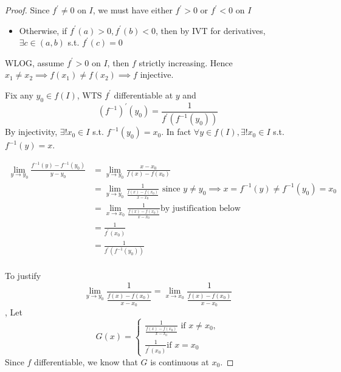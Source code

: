 \begin{proof}
    Since $f^{\prime} \neq 0$ on $I$, we must have
    either $f^{\prime} > 0$ or $f^{\prime} < 0$
    on $I$
    \begin{itemize}
        \item Otherwise, if $f^{\prime}(a) > 0, f^{\prime}(b) < 0$,
        then by IVT for derivatives, $\exists c \in (a, b)$ s.t. 
        $f^{\prime}(c) = 0$
    \end{itemize} 
    WLOG, assume $f^{\prime} > 0$ on $I$, then $f$ strictly increasing.
    Hence $x_1 \neq x_2 \implies f(x_1) \neq f(x_2) \implies f$  injective.
    \medskip

    Fix any $y_{0} \in f(I)$, WTS $f^{\prime}$ differentiable at $y$ and
    \[
        (f^{-1})^{\prime}(y_{0}) = 
        \frac{1}{ f^{\prime} \left( f^{-1}(y_{0}) \right) }
    \]
    By injectivity, $\exists !x_0 \in I $ s.t. 
    $f^{-1}(y_0) = x_0$.
    In fact $ \forall y \in f(I), \exists ! x_0 \in I$
    s.t. $f^{-1}(y) = x$.

    \begin{align*}
        \lim_{y \to y_{0}} \frac{f^{-1}(y) - f^{-1}(y_{0})}{y - y_{0}}
        &=
        \lim_{y \to y_{0}} \frac{x - x_{0}}{f(x) - f(x_{0})} \\
        &=
        \lim_{y \to y_{0}} \frac{1}{
            \frac{f(x) - f(x_{0})}{x - x_{0}}
        } 
        \text{ since } 
        y \neq y_{0} \implies x = f^{-1} (y) \neq f^{-1}(y_{0}) = x_{0}
        \\
        &=
        \lim_{x \to x_{0}} \frac{1}{
            \frac{f(x) - f(x_{0})}{x - x_{0}}
        } \text{by justification below}
        \\
        &=
        \frac{1}{
            f^{\prime}(x_{0})
        } \\
        &=
        \frac{1}{
            f^{\prime}(f^{-1}(y_{0}))
        } \\
    \end{align*}

    To justify 
    \[
        \lim_{y \to y_{0}} \frac{1}{
            \frac{f(x) - f(x_{0})}{x - x_{0}}
        } 
        =
        \lim_{x \to x_{0}} \frac{1}{
            \frac{f(x) - f(x_{0})}{x - x_{0}}
        }
    \],
    Let
    \[
        G(x) = \begin{cases}
            \frac{1}{
                \frac{
                    f(x) - f(x_{0})
                }{
                    x - x_{0}
                }
            } \text{ if } x \neq x_0, \\
            \frac{1}{f^{\prime}(x_{0})} \text{if } x = x_{0}
        \end{cases}
    \]
    Since $f$ differentiable, we know that 
    $G$ is continuous at $x_0$.


\end{proof}
